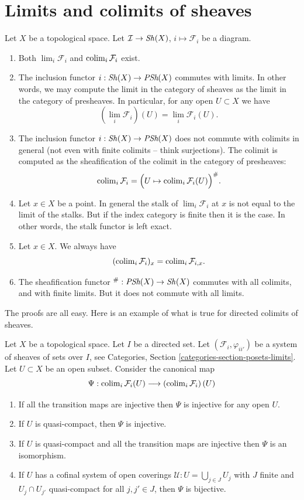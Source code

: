 \section{Limits and colimits of sheaves}
\label{section-limits-sheaves}

\noindent
Let $X$ be a topological space.
Let $\mathcal{I} \to \mathop{\mathit{Sh}}\nolimits(X)$, $i \mapsto \mathcal{F}_i$
be a diagram.
\begin{enumerate}
\item Both $\lim_i \mathcal{F}_i$ and $\mathop{\mathrm{colim}}\nolimits_i \mathcal{F}_i$
exist.
\item The inclusion functor $i : \mathop{\mathit{Sh}}\nolimits(X) \to \textit{PSh}(X)$
commutes with limits. In other words, we may compute the limit
in the category of sheaves as the limit in the category of
presheaves. In particular, for any open $U \subset X$ we have
$$
(\lim_i \mathcal{F}_i)(U) = \lim_i \mathcal{F}_i(U).
$$
\item The inclusion functor $i : \mathop{\mathit{Sh}}\nolimits(X) \to \textit{PSh}(X)$
does not commute with colimits in general (not even
with finite colimits -- think surjections). The colimit is
computed as the sheafification of the colimit in the
category of presheaves:
$$
\mathop{\mathrm{colim}}\nolimits_i \mathcal{F}_i =
\Big(U \mapsto \mathop{\mathrm{colim}}\nolimits_i \mathcal{F}_i(U)\Big)^\#.
$$
\item Let $x \in X$ be a point. In general the stalk of
$\lim_i \mathcal{F}_i$ at $x$ is not equal to
the limit of the stalks. But if the index category is finite
then it is the case. In other words, the stalk functor is
left exact.
\item Let $x \in X$. We always have
$$
(\mathop{\mathrm{colim}}\nolimits_i \mathcal{F}_i)_x = \mathop{\mathrm{colim}}\nolimits_i \mathcal{F}_{i, x}.
$$
\item The sheafification functor
${}^\# : \textit{PSh}(X) \to \mathop{\mathit{Sh}}\nolimits(X)$ commutes with all
colimits, and with finite limits. But it does not commute
with all limits.
\end{enumerate}
The proofs are all easy. Here is an example of what is true for directed
colimits of sheaves.

\begin{lemma}
\label{lemma-directed-colimits-sections}
Let $X$ be a topological space. Let $I$ be a directed set.
Let $(\mathcal{F}_i, \varphi_{ii'})$ be a system of sheaves of sets
over $I$, see
Categories, Section \ref{categories-section-posets-limits}.
Let $U \subset X$ be an open subset.
Consider the canonical map
$$
\Psi :
\mathop{\mathrm{colim}}\nolimits_i \mathcal{F}_i(U)
\longrightarrow
\left(\mathop{\mathrm{colim}}\nolimits_i \mathcal{F}_i\right)(U)
$$
\begin{enumerate}
\item If all the transition maps are injective then
$\Psi$ is injective for any open $U$.
\item If $U$ is quasi-compact, then $\Psi$ is injective.
\item If $U$ is quasi-compact and all the transition maps are injective
then $\Psi$ is an isomorphism.
\item If $U$ has a cofinal system of open coverings
$\mathcal{U} : U = \bigcup_{j\in J} U_j$ with
$J$ finite and $U_j \cap U_{j'}$ quasi-compact
for all $j, j' \in J$, then $\Psi$ is bijective.
\end{enumerate}
\end{lemma}

